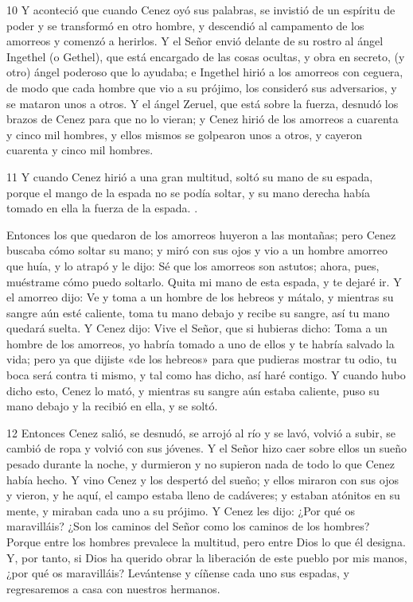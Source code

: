 \par 10 Y aconteció que cuando Cenez oyó sus palabras, se invistió de un espíritu de poder y se transformó en otro hombre, y descendió al campamento de los amorreos y comenzó a herirlos. Y el Señor envió delante de su rostro al ángel Ingethel (o Gethel), que está encargado de las cosas ocultas, y obra en secreto, (y otro) ángel poderoso que lo ayudaba; e Ingethel hirió a los amorreos con ceguera, de modo que cada hombre que vio a su prójimo, los consideró sus adversarios, y se mataron unos a otros. Y el ángel Zeruel, que está sobre la fuerza, desnudó los brazos de Cenez para que no lo vieran; y Cenez hirió de los amorreos a cuarenta y cinco mil hombres, y ellos mismos se golpearon unos a otros, y cayeron cuarenta y cinco mil hombres.

\par 11 Y cuando Cenez hirió a una gran multitud, soltó su mano de su espada, porque el mango de la espada no se podía soltar, y su mano derecha había tomado en ella la fuerza de la espada. .

\par Entonces los que quedaron de los amorreos huyeron a las montañas; pero Cenez buscaba cómo soltar su mano; y miró con sus ojos y vio a un hombre amorreo que huía, y lo atrapó y le dijo: Sé que los amorreos son astutos; ahora, pues, muéstrame cómo puedo soltarlo. Quita mi mano de esta espada, y te dejaré ir. Y el amorreo dijo: Ve y toma a un hombre de los hebreos y mátalo, y mientras su sangre aún esté caliente, toma tu mano debajo y recibe su sangre, así tu mano quedará suelta. Y Cenez dijo: Vive el Señor, que si hubieras dicho: Toma a un hombre de los amorreos, yo habría tomado a uno de ellos y te habría salvado la vida; pero ya que dijiste «de los hebreos» para que pudieras mostrar tu odio, tu boca será contra ti mismo, y tal como has dicho, así haré contigo. Y cuando hubo dicho esto, Cenez lo mató, y mientras su sangre aún estaba caliente, puso su mano debajo y la recibió en ella, y se soltó.

\par 12 Entonces Cenez salió, se desnudó, se arrojó al río y se lavó, volvió a subir, se cambió de ropa y volvió con sus jóvenes. Y el Señor hizo caer sobre ellos un sueño pesado durante la noche, y durmieron y no supieron nada de todo lo que Cenez había hecho. Y vino Cenez y los despertó del sueño; y ellos miraron con sus ojos y vieron, y he aquí, el campo estaba lleno de cadáveres; y estaban atónitos en su mente, y miraban cada uno a su prójimo. Y Cenez les dijo: ¿Por qué os maravilláis? ¿Son los caminos del Señor como los caminos de los hombres? Porque entre los hombres prevalece la multitud, pero entre Dios lo que él designa. Y, por tanto, si Dios ha querido obrar la liberación de este pueblo por mis manos, ¿por qué os maravilláis? Levántense y cíñense cada uno sus espadas, y regresaremos a casa con nuestros hermanos.

